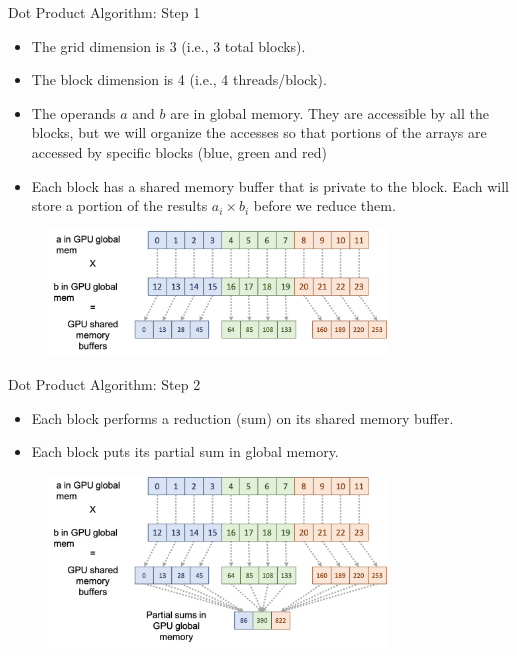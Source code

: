 \documentclass{beamer}
\begin{document}
    \begin{frame}{Dot Product Algorithm: Step 1}
        \begin{itemize}
            \item The grid dimension is 3 (i.e., 3 total blocks).
            \item The block dimension is 4 (i.e., 4 threads/block).
            \item The operands $a$ and $b$ are in global memory.  They are accessible by all the blocks, but we will organize the accesses so that portions of the arrays are accessed by specific blocks (blue, green and red)
            \item Each block has a shared memory buffer that is private to the block.  Each will store a portion of the results $a_i \times b_i$ before we reduce them.
        \end{itemize}
        \begin{figure}
            \centering
            \includegraphics[width=0.8\textwidth]{img/04/dot-01.png}
        \end{figure}
    \end{frame}

    \begin{frame}{Dot Product Algorithm: Step 2}
        \begin{itemize}
            \item Each block performs a reduction (sum) on its shared memory buffer.
            \item Each block puts its partial sum in global memory.
        \end{itemize}
        \begin{figure}
            \centering
            \includegraphics[width=0.8\textwidth]{img/04/dot-02.png}
        \end{figure}
    \end{frame}
\end{document}
